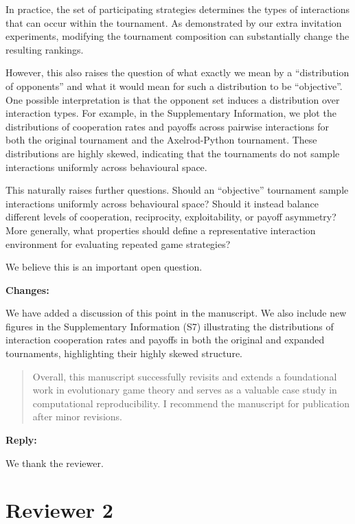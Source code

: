 \documentclass[11pt]{article}
\newcommand{\reply}{
\vspace{0.25em}
{\color{ForestGreen}\textbf{Reply:}}
}
\newcommand{\changes}{
\vspace{0.25em}
{\color{BrickRed}\textbf{Changes:}}
}
\newenvironment{reviewercomment}
{
\vspace{0.5em}
\begin{quote}
\color{NavyBlue}
}
{
\end{quote}
}
\newcommand{\AXL}{Axelrod-Python}
\begin{document}
In practice, the set of participating strategies determines the
types of interactions that can occur within the tournament. As demonstrated by
our extra invitation experiments, modifying the tournament composition can
substantially change the resulting rankings.

However, this also raises the question of what exactly we mean by a
``distribution of opponents'' and what it would mean for such a distribution
to be ``objective''. One possible interpretation is that the opponent set
induces a distribution over interaction types. For example, in the
Supplementary Information, we plot the distributions of cooperation rates and
payoffs across pairwise interactions for both the original tournament and the
\AXL{} tournament. These distributions are highly skewed, indicating
that the tournaments do not sample interactions uniformly across behavioural
space.

This naturally raises further questions. Should an ``objective'' tournament
sample interactions uniformly across behavioural space? Should it instead
balance different levels of cooperation, reciprocity, exploitability, or payoff
asymmetry? More generally, what properties should define a representative
interaction environment for evaluating repeated game strategies?

We believe this is an important open question.

\changes

We have added a discussion of this point in the manuscript. We also include new
figures in the Supplementary Information (S7) illustrating the distributions of
interaction cooperation rates and payoffs in both the original and expanded
tournaments, highlighting their highly skewed structure.

\begin{reviewercomment}
Overall, this manuscript successfully revisits and extends a foundational work
in evolutionary game theory and serves as a valuable case study in computational
reproducibility. I recommend the manuscript for publication after minor
revisions.
\end{reviewercomment}

\reply

We thank the reviewer.


\section*{Reviewer 2}
\end{document}
